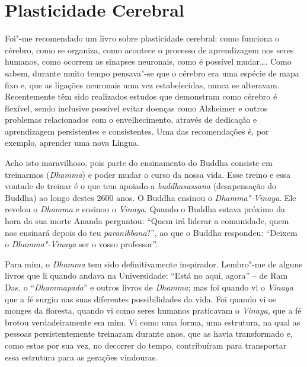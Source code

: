\chapter{Plasticidade Cerebral}

Foi"-me recomendado um livro sobre plasticidade cerebral: como funciona o
cérebro, como se organiza, como acontece o processo de aprendizagem nos
seres humanos, como ocorrem as sinapses neuronais, como é possível
mudar\ldots{}. Como sabem, durante muito tempo pensava"-se que o cérebro
era uma espécie de mapa fixo e, que as ligações neuronais uma vez
estabelecidas, nunca se alteravam. Recentemente têm sido realizados
estudos que demonstram como cérebro é flexível, sendo inclusive possível
evitar doenças como Alzheimer e outros problemas relacionados com o
envelhecimento, através de dedicação e aprendizagem persistentes e
consistentes. Uma das recomendações é, por exemplo, aprender uma nova
Língua.

Acho isto maravilhoso, pois parte do ensinamento do Buddha consiste em
treinarmos (\emph{Dhamma}) e poder mudar o curso da nossa vida. Esse
treino e essa vontade de treinar é o que tem apoiado a
\emph{buddhasassana} (desapensação do Buddha) ao longo destes 2600 anos.
O Buddha ensinou o \emph{Dhamma"-Vinaya}. Ele revelou o \emph{Dhamma} e
ensinou o \emph{Vinaya}. Quando o Buddha estava próximo da hora da sua
morte Ananda perguntou: ``Quem irá liderar a comunidade, quem nos
ensinará depois do teu \emph{paranibbana}?'', ao que o Buddha respondeu:
``Deixem o \emph{Dhamma"-Vinaya} ser o vosso professor''.

Para mim, o \emph{Dhamma} tem sido definitivamente inspirador. Lembro"-me
de alguns livros que li quando andava na Universidade: ``Está no aqui,
agora'' -- de Ram Das, o ``\emph{Dhammapada}'' e outros livros de
\emph{Dhamma}; mas foi quando vi o \emph{Vinaya} que a fé surgiu nas
suas diferentes possibilidades da vida. Foi quando vi os monges da
floresta, quando vi como seres humanos praticavam o \emph{Vinaya}, que a
fé brotou verdadeiramente em mim. Vi como uma forma, uma estrutura, na
qual as pessoas persistentemente treinaram durante anos, que as havia
transformado e, como estas por sua vez, no decorrer do tempo,
contribuíram para transportar essa estrutura para as gerações vindouras.

